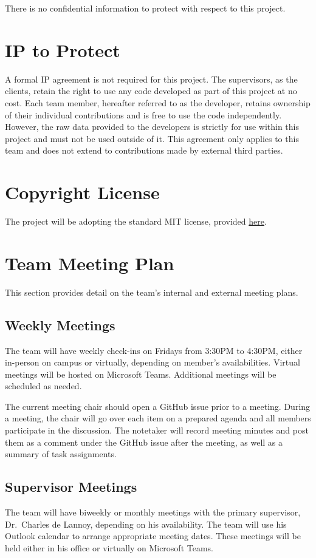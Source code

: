 \documentclass{article}
\begin{document}
There is no confidential information to protect with respect to this project.

\section{IP to Protect}

A formal IP agreement is not required for this project. The supervisors, as the
clients, retain the right to use any code developed as part of this project at
no cost. Each team member, hereafter referred to as the developer, retains
ownership of their individual contributions and is free to use the code
independently. However, the raw data provided to the developers is strictly for
use within this project and must not be used outside of it. This agreement only
applies to this team and does not extend to contributions made by external third
parties.

\section{Copyright License}

The project will be adopting the standard MIT license, provided
\href{https://github.com/SumanyaG/Alkalytics/blob/main/LICENSE}{here}.

\section{Team Meeting Plan}
This section provides detail on the team's internal and external meeting plans.
\subsection{Weekly Meetings}
The team will have weekly check-ins on Fridays from 3:30PM to 4:30PM, either
in-person on campus or virtually, depending on member's availabilities. Virtual
meetings will be hosted on Microsoft Teams. Additional meetings will be
scheduled as needed.\newline

\noindent The current meeting chair should open a GitHub issue prior to a
meeting. During a meeting, the chair will go over each item on a prepared agenda
and all members participate in the discussion. The notetaker will record meeting
minutes and post them as a comment under the GitHub issue after the meeting, as
well as a summary of task assignments.

\subsection{Supervisor Meetings}
The team will have biweekly or monthly meetings with the primary supervisor,
Dr.\ Charles de Lannoy, depending on his availability. The team will use his
Outlook calendar to arrange appropriate meeting dates. These meetings will be
held either in his office or virtually on Microsoft Teams.\newline
\end{document}
